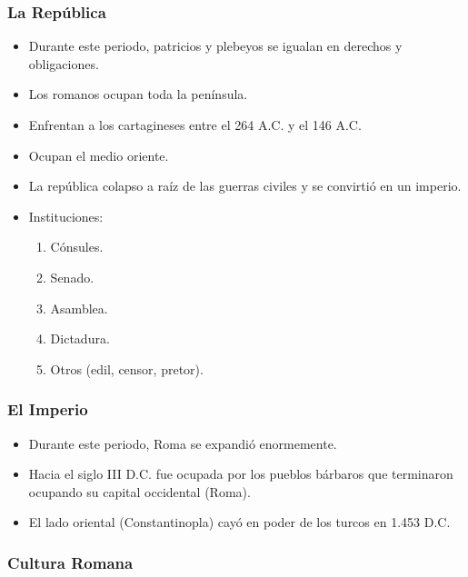 \subsubsection{La República}

\begin{itemize}

\item Durante este periodo, patricios y plebeyos se igualan en derechos y obligaciones.

\item Los romanos ocupan toda la península.

\item Enfrentan a los cartagineses entre el 264 A.C. y el 146 A.C.

\item Ocupan el medio oriente.

\item La república colapso a raíz de las guerras civiles y se convirtió en un imperio.

\item Instituciones:
\begin{enumerate}
	\item Cónsules.
	\item Senado.
	\item Asamblea.
	\item Dictadura.
	\item Otros (edil, censor, pretor).
\end{enumerate}

\end{itemize}

\subsubsection{El Imperio}

\begin{itemize}

\item Durante este periodo, Roma se expandió enormemente.

\item Hacia el siglo III D.C. fue ocupada por los pueblos bárbaros que terminaron ocupando su capital occidental (Roma).

\item El lado oriental (Constantinopla) cayó en poder de los turcos en 1.453 D.C.

\end{itemize}

\subsubsection{Cultura Romana}

